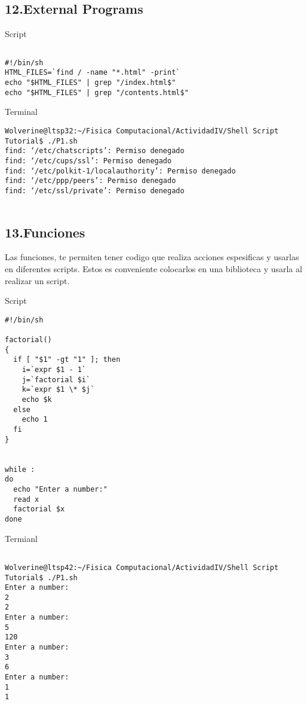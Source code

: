 \documentclass[a4paper]{article}
\begin{document}
\begin{verbatim}



\end{verbatim}

\subsection{12.External Programs}

Script

\begin{verbatim}

#!/bin/sh
HTML_FILES=`find / -name "*.html" -print`
echo "$HTML_FILES" | grep "/index.html$"
echo "$HTML_FILES" | grep "/contents.html$"

\end{verbatim}

Terminal

\begin{verbatim}
Wolverine@ltsp32:~/Fisica Computacional/ActividadIV/Shell Script Tutorial$ ./P1.sh
find: ‘/etc/chatscripts’: Permiso denegado
find: ‘/etc/cups/ssl’: Permiso denegado
find: ‘/etc/polkit-1/localauthority’: Permiso denegado
find: ‘/etc/ppp/peers’: Permiso denegado
find: ‘/etc/ssl/private’: Permiso denegado


\end{verbatim}

\subsection{13.Funciones}
Las funciones, te permiten tener codigo que realiza acciones espesificas y usarlas en diferentes scripts. Estos es conveniente colocarlos en una biblioteca y usarla al realizar un script.

Script

\begin{verbatim}
#!/bin/sh

factorial()
{
  if [ "$1" -gt "1" ]; then
    i=`expr $1 - 1`
    j=`factorial $i`
    k=`expr $1 \* $j`
    echo $k
  else
    echo 1
  fi
}


while :
do
  echo "Enter a number:"
  read x
  factorial $x
done   

\end{verbatim}
Termianl
\begin{verbatim}

Wolverine@ltsp42:~/Fisica Computacional/ActividadIV/Shell Script Tutorial$ ./P1.sh
Enter a number:
2
2
Enter a number:
5
120
Enter a number:
3
6
Enter a number:
1
1


\end{verbatim}
\end{document}
